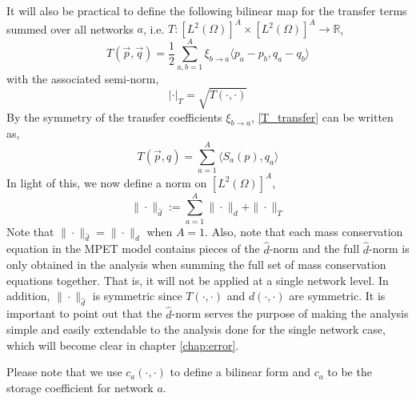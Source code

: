 \\
\\
It will also be practical to define the following bilinear map for the transfer terms summed over all networks $a$, i.e. $T : [L^2(\Omega)]^A \times [L^2(\Omega)]^A \to \mathbb{R}$,
\begin{equation} \label{T_transfer}
T(\vec{p},\vec{q}) = \frac{1}{2}\sum_{a,b=1}^A \xi_{b\rightarrow a} \langle p_{a} - p_{b}, q_a - q_b\rangle
\end{equation}
with the associated semi-norm, 
\begin{equation}
| \cdot |_T = \sqrt{T(\cdot, \cdot) }
\end{equation}
By the symmetry of the transfer coefficients $\xi_{b \to a}$, \eqref{T_transfer} can be written as, 
\begin{equation} \label{T(p,q)}
T(\vec{p},q) = \sum_{a=1}^A \langle S_a(p), q_a\rangle
\end{equation}
In light of this, we now define a norm on $[L^2(\Omega)]^A$, 
\begin{equation} \label{d_hat_norm}
\| \cdot\|_{\hat{d}} := \sum_{a=1}^A \|\cdot \|_d + \| \cdot \|_T
\end{equation}
Note that $\| \cdot\|_{\hat{d}} = \|\cdot \|_d$ when $A=1$. Also, note that each mass conservation equation in the MPET model contains pieces of the $\hat{d}$-norm and the full $\hat{d}$-norm is only obtained in the analysis when summing the full set of mass conservation equations together. That is, it will not be applied at a single network level. In addition, $\| \cdot\|_{\hat{d}}$ is symmetric since $T(\cdot,\cdot)$ and $d(\cdot,\cdot)$ are symmetric. It is important to point out that the $\hat{d}$-norm serves the purpose of making the analysis simple and easily extendable to the analysis done for the single network case, which will become clear in chapter \ref{chap:error}.
\begin{remark}
Please note that we use $c_a(\cdot, \cdot)$ to define a bilinear form and $c_a$ to be the storage coefficient for network $a$.
\end{remark} 

